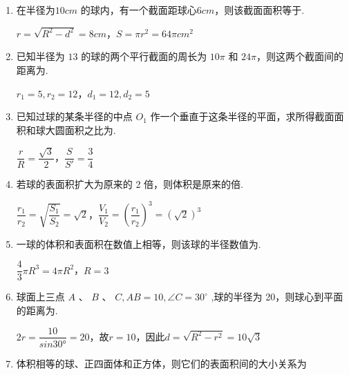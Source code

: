 \begin{enumerate}
    \item 在半径为$10cm$ 的球内，有一个截面距球心$6cm$，则该截面面积等于.
    \begin{jieda}
        $r = \sqrt{R^2-d^2} = 8cm$，$S = \pi r^2 = 64\pi cm^2$
    \end{jieda}

    \item 已知半径为 $13$ 的球的两个平行截面的周长为 $10\pi$ 和 $24\pi$，则这两个截面间的距离为.
    \begin{jieda}
        $r_1 = 5, r_2 = 12$，$d_1 = 12, d_2 = 5$
    \end{jieda}

    \item 已知过球的某条半径的中点 ${O}_{1}$ 作一个垂直于这条半径的平面，求所得截面面积和球大圆面积之比为.
    \begin{jieda}
        $\dfrac{r}{R} = \dfrac{\sqrt{3}}{2}$，$\dfrac{S}{S'} = \dfrac{3}{4}$
    \end{jieda}

    \item 若球的表面积扩大为原来的 2 倍，则体积是原来的倍.
    \begin{jieda}
        $\dfrac{r_1}{r_2} = \sqrt{\dfrac{S_1}{S_2}} = \sqrt{2}$，$\dfrac{V_1}{V_2} = \left(\dfrac{r_1}{r_2}\right)^3 = (\sqrt{2})^3$
    \end{jieda}

    \item 一球的体积和表面积在数值上相等，则该球的半径数值为.
    \begin{jieda}
        $\dfrac{4}{3}\pi R^3 = 4\pi R^2$，$R = 3$
    \end{jieda}

    \item 球面上三点 ${A}\text{ 、 }{B}\text{ 、 }{C},{{AB}} = {10},\angle {C} = {30}^{ \circ  }$ ,球的半径为 20，则球心到平面的距离为.
    \begin{jieda}
        $2r = \dfrac{10}{sin\ang{30}} = 20$，故$r = 10$，因此$d = \sqrt{R^2-r^2} = 10\sqrt{3}$
    \end{jieda}

    \item 体积相等的球、正四面体和正方体，则它们的表面积间的大小关系为
    

\end{enumerate}

